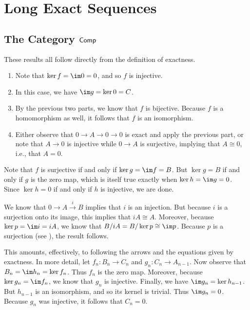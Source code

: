 \documentclass[../../solutions.tex]{subfiles}
\begin{document}
\section{Long Exact Sequences}

\subsection{\texorpdfstring{The Category $\mathsf{Comp}$}{The Category Comp}}
\begin{exercise} \leavevmode
These results all follow directly from the definition of exactness. 
\begin{enumerate}
\item Note that $\ker f=\im 0=0$, and so $f$ is injective. 
\item In this case, we have $\im g=\ker0=C$. 
\item By the previous two parts, we know that $f$ is bijective. 
Because $f$ is a homomorphism as well, it follows that $f$ is an isomorphism. 
\item Either observe that $0\to A\to0\to0$ is exact and apply the previous part, or note that $A\to0$ is injective while $0\to A$ is surjective, implying that $A\cong0$, i.e., that $A=0$. 
\end{enumerate}
\end{exercise}

\begin{exercise} \leavevmode
Note that $f$ is surjective if and only if $\ker g=\im f=B$. 
But $\ker g=B$ if and only if $g$ is the zero map, which is itself true exactly when $\ker h=\im g=0$. 
Since $\ker h=0$ if and only if $h$ is injective, we are done. 
\end{exercise}

\begin{exercise} \leavevmode
We know that $0\to A\xrightarrow{i}B$ implies that $i$ is an injection. 
But because $i$ is a surjection onto its image, this implies that $iA\cong A$. 
Moreover, because $\ker p=\im i=iA$, we know that $B/iA=B/\ker p\cong\im p$. 
Because $p$ is a surjection (see ), the result follows. 
\end{exercise}

\begin{exercise} \leavevmode
This amounts, effectively, to following the arrows and the equations given by exactness. 
In more detail, let $f_n:B_n\to C_n$ and $g_n:C_n\to A_{n-1}$. 
Now observe that $B_n=\im h_n=\ker f_n$. 
Thus $f_n$ is the zero map. 
Moreover, because $\ker g_n=\im f_n$, we know that $g_n$ is injective. 
Finally, we have $\im g_n=\ker h_{n-1}$. 
But $h_{n-1}$ is an isomorphism, and so its kernel is trivial. 
Thus $\im g_n=0$. 
Because $g_n$ was injective, it follows that $C_n=0$. 
\end{exercise}
\end{document}
